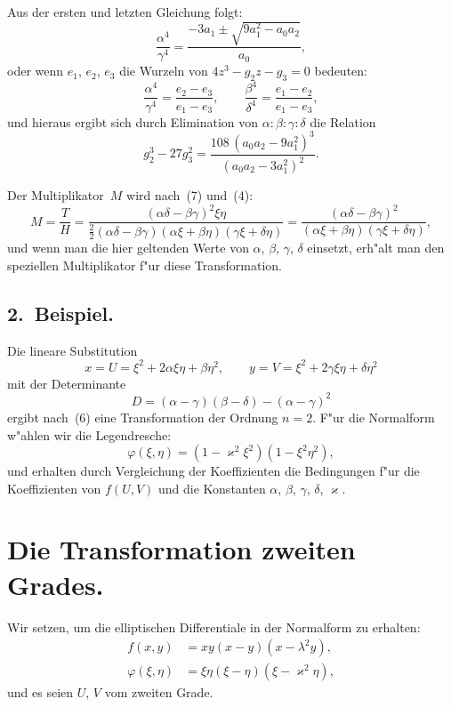 \documentclass[12pt,a4paper]{article}
\theoremstyle{definition}
\begin{document}
\newpage

Aus der ersten und letzten Gleichung folgt:
\[\frac{\alpha^4}{\gamma^4} = \frac{-3a_1 \pm \sqrt{9a_1^2 - a_0a_2}}{a_0},
\]
oder wenn $e_1$, $e_2$, $e_3$ die Wurzeln von $4z^3 - g_2z - g_3 = 0$ bedeuten:
\[\frac{\alpha^4}{\gamma^4} = \frac{e_2 - e_3}{e_1 - e_3},\qquad \frac{\beta^4}{\delta^4} = \frac{e_1 - e_2}{e_1 - e_3},
\]
und hieraus ergibt sich durch Elimination von $\alpha:\beta:\gamma:\delta$ die Relation
\[g_2^3 - 27g_3^2 = \frac{108\,(a_0a_2 - 9a_1^2)^3}{(a_0a_2 - 3a_1^2)^2}.
\]

Der Multiplikator~$M$ wird nach~(7) und~(4):
\[M = \frac{T}{H} = \frac{(\alpha\delta - \beta\gamma)^2\xi\eta}{\frac{2}{2}(\alpha\delta - \beta\gamma)(\alpha\xi + \beta\eta)(\gamma\xi + \delta\eta)} = \frac{(\alpha\delta - \beta\gamma)^2}{(\alpha\xi + \beta\eta)(\gamma\xi + \delta\eta)},
\]
und wenn man die hier geltenden Werte von $\alpha$, $\beta$, $\gamma$, $\delta$ einsetzt, erh"alt man den speziellen Multiplikator f"ur diese Transformation.

\subsection*{2.~Beispiel.} Die lineare Substitution
\begin{equation}\tag{11}
x = U = \xi^2 + 2\alpha\xi\eta + \beta\eta^2,\qquad y = V = \xi^2 + 2\gamma\xi\eta + \delta\eta^2
\end{equation}
mit der Determinante
\[D = (\alpha - \gamma)(\beta - \delta) - (\alpha - \gamma)^2
\]
ergibt nach~(6) eine Transformation der Ordnung $n = 2$. F"ur die Normalform w"ahlen wir die Legendresche:
\[\varphi(\xi,\eta) = (1 - \varkappa^2\xi^2)(1 - \xi^2\eta^2),
\]
und erhalten durch Vergleichung der Koeffizienten die Bedingungen f"ur die Koeffizienten von $f(U,V)$ und die Konstanten $\alpha$, $\beta$, $\gamma$, $\delta$, $\varkappa$.

\newpage

\section{Die Transformation zweiten Grades.}

Wir setzen, um die elliptischen Differentiale in der Normalform zu erhalten:
\begin{align*}
f(x,y) &= xy(x-y)(x-\lambda^2y),\\
\varphi(\xi,\eta) &= \xi\eta(\xi-\eta)(\xi-\varkappa^2\eta),
\end{align*}
und es seien $U$, $V$ vom zweiten Grade.
\end{document}
